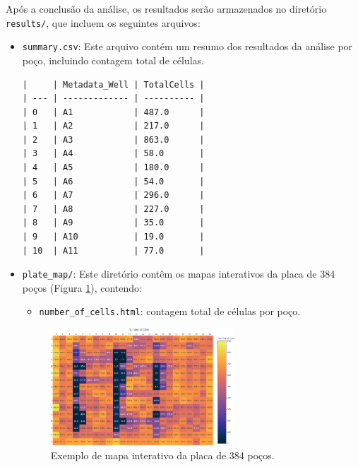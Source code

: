 \documentclass{article}
\begin{document}
Após a conclusão da análise, os resultados serão armazenados no diretório \texttt{results/}, que incluem os seguintes arquivos:

\begin{itemize}
  \item \texttt{summary.csv}: Este arquivo contém um resumo dos resultados da análise por poço, incluindo contagem total de células.

\begin{verbatim}
|     | Metadata_Well | TotalCells |
| --- | ------------- | ---------- |
| 0   | A1            | 487.0      |
| 1   | A2            | 217.0      |
| 2   | A3            | 863.0      |
| 3   | A4            | 58.0       |
| 4   | A5            | 180.0      |
| 5   | A6            | 54.0       |
| 6   | A7            | 296.0      |
| 7   | A8            | 227.0      |
| 8   | A9            | 35.0       |
| 9   | A10           | 19.0       |
| 10  | A11           | 77.0       |
\end{verbatim}
  
  \item \texttt{plate\_map/}: Este diretório contêm os mapas interativos da placa de 384 poços (Figura \ref{fig:plate_map}), contendo:

  \begin{itemize}
    \item \texttt{number\_of\_cells.html}: contagem total de células por poço.
  \end{itemize}

  \begin{figure}[H]
    \centering
    \includegraphics[width=0.65\textwidth]{images/example_plate_map.png}
    \caption{Exemplo de mapa interativo da placa de 384 poços.}
    \label{fig:plate_map}
  \end{figure}

\end{itemize}
\end{document}
